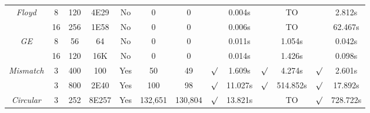 \begin{savenotes}
\begin{table*}[t]
\begin{center}
\begin{threeparttable}
\begin{tabular}{|c|c|c|c|c|c|c|c|c|c|c|c|c|}
						       
	    \multirow{2}{*}{\textit{Floyd}} & 8 & 120 &  4E29 
          						        & No  &0 &0&  & 0.004s &  & TO &  & 2.812s\\ \cline{2-13}
						       		& 16 & 256 &  1E58 
          						         & No  &0 & 0&  & 0.006s &  & TO &  & 62.467s\\ \hline
						        \hline
	    \multirow{2}{*}{\textit{GE}} & 8 & 56 & 64  
          						        & No  &0 &0&  & 0.011s &  & 1.054s &  & 0.042s\\ \cline{2-13}
						       		& 16 & 120 & 16K  
          						         & No  &0 & 0&  & 0.014s &  & 1.426s &  & 0.098s\\ \hline
						        \hline
			        
             
						        
	     \multirow{2}{*}{\textit{Mismatch}} & 3 & 400 & 100  & Yes  &50 &49 & $\surd$ & 1.609s  & $\surd$  & 4.274s & $\surd$ & 2.601s\\ \cline{2-13}
          					& 3 & 800 & 2E40  & Yes  &100& 98 & $\surd$ & 11.027s  & $\surd$ & 514.852s & $\surd$ & 17.892s\\ \hline
          \hline
          
           \textit{Circular} & 3 & 252 & 8E257  & Yes  & 132,651 & 130,804 & $\surd$ & 13.821s  &  & TO & $\surd$ & 728.722s\\ \hline

						                       
\end{tabular}
\end{threeparttable}
\end{center}
\end{table*}
\end{savenotes}

